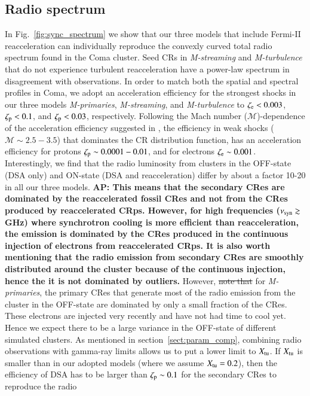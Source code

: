 \documentclass[fleqn,usenatbib,useAMS]{mnras}
\newcommand{\Mstream}{{\it M-streaming}\xspace}
\newcommand{\Mflatturb}{{\it M-turbulence}\xspace}
\newcommand{\Mprimary}{{\it M-primaries}\xspace}
\def\AP2#1{{\bf  AP2: #1}}
\def\AP#1{{\bf {\color{blue} AP: #1}}}
\begin{document}
\subsection{Radio spectrum}
\label{sect:radio_spec}
In Fig.~\ref{fig:sync_spectrum} we show that our three models that
include Fermi-II reacceleration can individually reproduce the
convexly curved total radio spectrum found in the Coma cluster. Seed
CRs in \Mstream and \Mflatturb that do not experience turbulent
reacceleration have a power-law spectrum in disagreement with
observations. In order to match both the spatial and spectral profiles
in Coma, we adopt an acceleration efficiency for the strongest shocks
in our three models \Mprimary, \Mstream, and \Mflatturb to
$\zeta_{{\mathrm{e}}} <0.003$, $\zeta_{{\mathrm{p}}} < 0.1$, and
$\zeta_{{\mathrm{p}}}<0.03$, respectively. Following the Mach number
($\mathcal{M}$)-dependence of the acceleration efficiency suggested in
\cite{pinzke13}, the efficiency in weak shocks ($\mathcal{M}\sim
2.5-3.5$) that dominates the CR distribution function, has an
acceleration efficiency for protons $\zeta_{{\mathrm{p}}}\sim0.0001-0.01$,
and for electrons $\zeta_{{\mathrm{e}}}\sim 0.001$. Interestingly, we find
that the radio luminosity from clusters in the OFF-state (DSA only)
and ON-state (DSA and reacceleration) differ by about a factor 10-20
in all our three models. \AP{This means that the secondary CRes are
  dominated by the reaccelerated fossil CRes and not from the CRes
  produced by reaccelerated CRps. However, for high frequencies
  ($\nu_{\mathrm{syn}}\gtrsim$ GHz) where synchrotron cooling is more
  efficient than reacceleration, the emission is dominated by the CRes
  produced in the continuous injection of electrons from reaccelerated
  CRps. It is also worth mentioning that the radio emission from
  secondary CRes are smoothly distributed around the cluster because
  of the continuous injection, hence the it is not dominated by
  outliers.} However, \sout{note that} for \Mprimary, the primary CRes
that generate most of the radio emission from the cluster in the
OFF-state are dominated by only a small fraction of the CRes. These
electrons are injected very recently and have not had time to cool
yet. Hence we expect there to be a large variance in the OFF-state of
different simulated clusters. As mentioned in
section~\ref{sect:param_comp}, combining radio observations with
gamma-ray limits allows us to put a lower limit to $X_{\mathrm{tu}}$.  If
$X_{\mathrm{tu}}$ is smaller than in our adopted models (where we assume
$X_{\mathrm{tu}}=0.2$), then the efficiency of DSA has to be larger than
$\zeta_{\mathrm{p}}\sim 0.1$ for the secondary CRes to reproduce the radio
\end{document}
